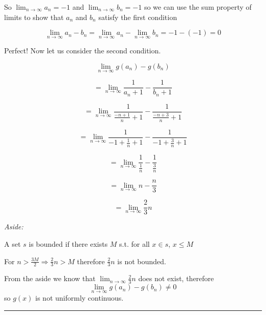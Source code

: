 \documentclass[10pt,letterpaper]{article}
\newcommand\ds{\displaystyle}
\newcommand\qedsym{\hfill \rule{2mm}{2mm}}
\begin{document}
So $\lim_{n\to\infty}a_n = -1$ and $\lim_{n\to\infty}b_n=-1$ so we can use the sum property of limits to show that $a_n$ and $b_n$ satisfy the first condition

\[\ds\lim_{n\to\infty}a_n-b_n = \lim_{n\to\infty}a_n - \lim_{n\to\infty}b_n = -1-(-1) = 0\]

Perfect! Now let us consider the second condition.

\[\ds\lim_{n\to\infty}g(a_n)-g(b_n)\]

\[=\ds\lim_{n\to\infty}\frac{1}{a_n+1}-\frac{1}{b_n+1}\]

\[=\ds\lim_{n\to\infty}\frac{1}{\frac{-n+1}{n}+1}-\frac{1}{\frac{-n+3}{n}+1}\]

\[=\ds\lim_{n\to\infty}\frac{1}{-1+\frac{1}{n}+1}-\frac{1}{-1 + \frac{3}{n}+1}\]

\[=\ds\lim_{n\to\infty}\frac{1}{\frac{1}{n}}-\frac{1}{\frac{3}{n}}\]

\[=\lim_{n\to\infty}n-\frac{n}{3}\]

\[=\lim_{n\to\infty}\frac{2}{3}n\]

\textit{Aside:}

A set $s$ is bounded if there exists $M$ s.t. for all $x\in s$, $x\leq M$

For $\ds n>\frac{3M}{2} \Rightarrow \frac{2}{3}n > M$ therefore $\frac{2}{3}n$ is not bounded.

From the aside we know that $\ds\lim_{n\to\infty}\frac{2}{3}n$ does not exist, therefore \[\ds\lim_{n\to\infty}g(a_n)-g(b_n) \neq 0\] so $g(x)$ is not uniformly continuous.

\qedsym
\end{document}
